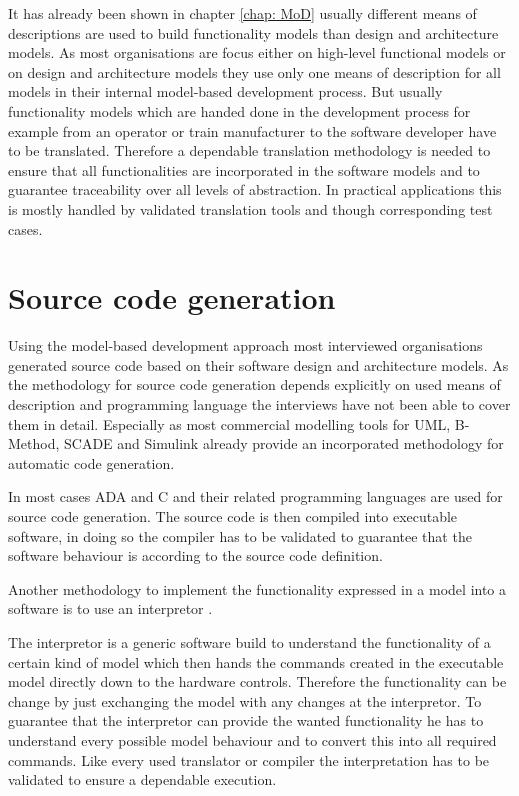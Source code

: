 \documentclass{./template/openetcs_report}
\begin{document}
It has already been shown in chapter \ref{chap: MoD} usually different means of descriptions are used to build functionality models than design and architecture models. As most organisations are focus either on high-level functional models or on design and architecture models they use only one means of description for all models in their internal model-based development process. But usually functionality models which are handed done in the development process for example from an operator or train manufacturer to the software developer have to be translated. Therefore a dependable translation methodology is needed to ensure that all functionalities are incorporated in the software models and to guarantee traceability over all levels of abstraction. In practical applications this is mostly handled by validated translation tools and though corresponding test cases.

\section{Source code generation}

Using the model-based development approach most interviewed organisations generated source code based on their software design and architecture models. As the  methodology for source code generation depends explicitly on used means of description and programming language the interviews have not been able to cover them in detail. Especially as most commercial modelling tools for UML, B-Method, SCADE and Simulink already provide an incorporated methodology for automatic code generation. 

In most cases ADA and C and their related programming languages are used for source code generation. The source code is then compiled into executable software, in doing so the compiler has to be validated to guarantee that the software behaviour is according to the source code definition.

Another methodology to implement the functionality expressed in a model into a software is to use an interpretor .

The interpretor is a generic software build to understand the functionality of a certain kind of model which then hands the commands created in the executable model directly down to the hardware controls. Therefore the functionality can be change by just exchanging the model with any changes at the interpretor. To guarantee that the interpretor can provide the wanted functionality he has to understand every possible model behaviour and to convert this into all required commands. Like every used translator or compiler the interpretation has to be validated to ensure a dependable execution.
\end{document}
